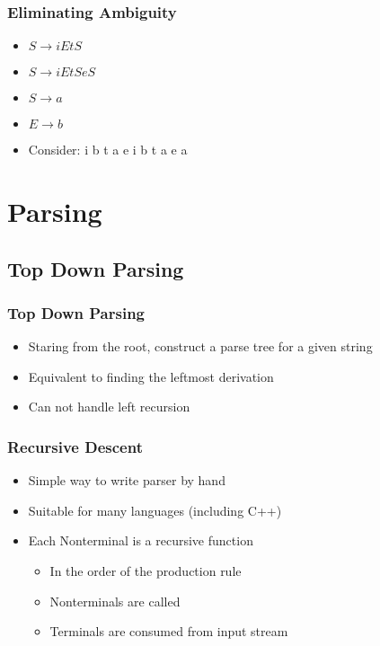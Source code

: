 \documentclass[usepdftitle=false,professionalfonts,compress ]{beamer}
\begin{document}
{
\begin{frame}\frametitle{Eliminating Ambiguity}

	\begin{itemize}
	\item $S \rightarrow i E t S$
			\item $S \rightarrow i E t S e S$
			\item $S \rightarrow a$
			\item $E \rightarrow b$
			\item Consider: i b t a e i b t a e a
				\end{itemize}

\end{frame}}








\section{Parsing}
		
\subsection{Top Down Parsing}

{
\begin{frame}\frametitle{Top Down Parsing}

	\begin{itemize}
	\item Staring from the root, construct a parse tree for a given string
			\item Equivalent to finding the leftmost derivation
			\item Can not handle left recursion
				\end{itemize}

\end{frame}}





{
\begin{frame}\frametitle{Recursive Descent}

	\begin{itemize}
	\item Simple way to write parser by hand
			\item Suitable for many languages (including C++)
			\item Each Nonterminal is a recursive function

	\begin{itemize}
	\item In the order of the production rule
			\item Nonterminals are called
			\item Terminals are consumed from input stream
				\end{itemize}

				\end{itemize}

\end{frame}}
\end{document}
